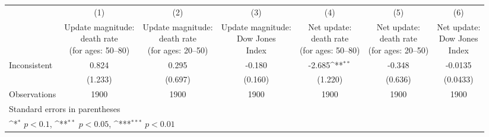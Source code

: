 {
\def\sym#1{\ifmmode^{#1}\else\(^{#1}\)\fi}
\begin{tabular}{l*{6}{c}}
\hline\hline
                    &\multicolumn{1}{c}{(1)}         &\multicolumn{1}{c}{(2)}         &\multicolumn{1}{c}{(3)}         &\multicolumn{1}{c}{(4)}         &\multicolumn{1}{c}{(5)}         &\multicolumn{1}{c}{(6)}         \\
                    &\shortstack{Update magnitude: \\ death rate \\ (for ages: 50--80)}         &\shortstack{Update magnitude: \\ death rate \\ (for ages: 20--50)}         &\shortstack{Update magnitude: \\ Dow Jones \\ Index}         &\shortstack{Net update: \\ death rate \\ (for ages: 50--80)}         &\shortstack{Net update: \\ death rate \\ (for ages: 20--50)}         &\shortstack{Net update: \\ Dow Jones \\ Index}         \\
\hline
Inconsistent        &       0.824         &       0.295         &      -0.180         &      -2.685\sym{**} &      -0.348         &     -0.0135         \\
                    &     (1.233)         &     (0.697)         &     (0.160)         &     (1.220)         &     (0.636)         &    (0.0433)         \\
\hline
Observations        &        1900         &        1900         &        1900         &        1900         &        1900         &        1900         \\
\hline\hline
\multicolumn{7}{l}{\footnotesize Standard errors in parentheses}\\
\multicolumn{7}{l}{\footnotesize \sym{*} \(p<0.1\), \sym{**} \(p<0.05\), \sym{***} \(p<0.01\)}\\
\end{tabular}
}
